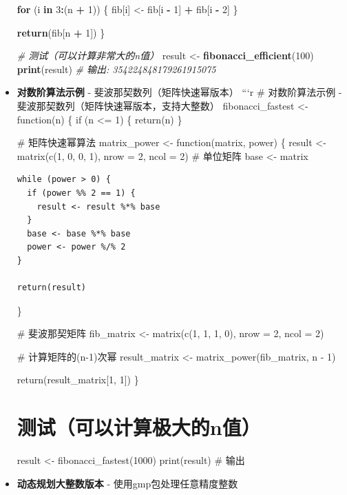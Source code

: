 \documentclass[
]{book}
\newenvironment{Shaded}{\begin{snugshade}}{\end{snugshade}}
\newcommand{\CommentTok}[1]{\textcolor[rgb]{0.56,0.35,0.01}{\textit{#1}}}
\newcommand{\ControlFlowTok}[1]{\textcolor[rgb]{0.13,0.29,0.53}{\textbf{#1}}}
\newcommand{\DecValTok}[1]{\textcolor[rgb]{0.00,0.00,0.81}{#1}}
\newcommand{\FunctionTok}[1]{\textcolor[rgb]{0.13,0.29,0.53}{\textbf{#1}}}
\newcommand{\NormalTok}[1]{#1}
\newcommand{\OtherTok}[1]{\textcolor[rgb]{0.56,0.35,0.01}{#1}}
\newcommand{\SpecialCharTok}[1]{\textcolor[rgb]{0.81,0.36,0.00}{\textbf{#1}}}
\begin{document}
\begin{itemize}
\begin{Shaded}
\begin{Highlighting}[]
\ControlFlowTok{for}\NormalTok{ (i }\ControlFlowTok{in} \DecValTok{3}\SpecialCharTok{:}\NormalTok{(n }\SpecialCharTok{+} \DecValTok{1}\NormalTok{)) \{}
\NormalTok{  fib[i] }\OtherTok{\textless{}{-}}\NormalTok{ fib[i }\SpecialCharTok{{-}} \DecValTok{1}\NormalTok{] }\SpecialCharTok{+}\NormalTok{ fib[i }\SpecialCharTok{{-}} \DecValTok{2}\NormalTok{]}
\NormalTok{\}}

\FunctionTok{return}\NormalTok{(fib[n }\SpecialCharTok{+} \DecValTok{1}\NormalTok{])}
\NormalTok{\}}

\CommentTok{\# 测试（可以计算非常大的n值）}
\NormalTok{result }\OtherTok{\textless{}{-}} \FunctionTok{fibonacci\_efficient}\NormalTok{(}\DecValTok{100}\NormalTok{)}
\FunctionTok{print}\NormalTok{(result)  }\CommentTok{\# 输出: 354224848179261915075}
\end{Highlighting}
\end{Shaded}
\item
  \textbf{对数阶算法示例} - 斐波那契数列（矩阵快速幂版本）
  ```r
  \# 对数阶算法示例 - 斐波那契数列（矩阵快速幂版本，支持大整数）
  fibonacci\_fastest \textless- function(n) \{
  if (n \textless= 1) \{
  return(n)
  \}

  \# 矩阵快速幂算法
  matrix\_power \textless- function(matrix, power) \{
  result \textless- matrix(c(1, 0, 0, 1), nrow = 2, ncol = 2) \# 单位矩阵
  base \textless- matrix

\begin{verbatim}
while (power > 0) {
  if (power %% 2 == 1) {
    result <- result %*% base
  }
  base <- base %*% base
  power <- power %/% 2
}

return(result)
\end{verbatim}

  \}

  \# 斐波那契矩阵
  fib\_matrix \textless- matrix(c(1, 1, 1, 0), nrow = 2, ncol = 2)

  \# 计算矩阵的(n-1)次幂
  result\_matrix \textless- matrix\_power(fib\_matrix, n - 1)

  return(result\_matrix{[}1, 1{]})
  \}

  \hypertarget{ux6d4bux8bd5ux53efux4ee5ux8ba1ux7b97ux6781ux5927ux7684nux503c}{%
  \chapter{测试（可以计算极大的n值）}\label{ux6d4bux8bd5ux53efux4ee5ux8ba1ux7b97ux6781ux5927ux7684nux503c}}

  result \textless- fibonacci\_fastest(1000)
  print(result) \# 输出
\item
  \textbf{动态规划大整数版本} - 使用gmp包处理任意精度整数


\end{itemize}
\end{document}
